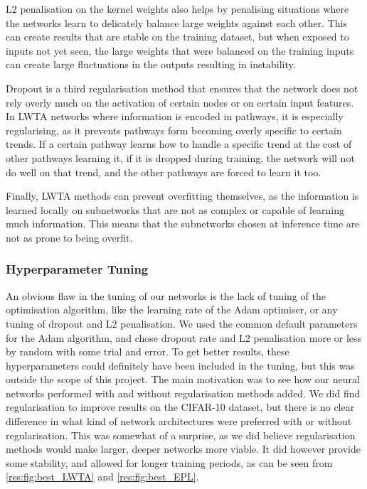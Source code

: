     L2 penalisation on the kernel weights also helps by penalising situations where the networks learn to delicately balance large weights against each other. This can create results that are stable on the training dataset, but when exposed to inputs not yet seen, the large weights that were balanced on the training inputs can create large fluctuations in the outputs resulting in instability.

    Dropout is a third regularisation method that ensures that the network does not rely overly much on the activation of certain nodes or on certain input features. In LWTA networks where information is encoded in pathways, it is especially regularising, as it prevents pathways form becoming overly specific to certain trends. If a certain pathway learns how to handle a specific trend at the cost of other pathways learning it, if it is dropped during training, the network will not do well on that trend, and the other pathways are forced to learn it too.

    Finally, LWTA methods can prevent overfitting themselves, as the information is learned locally on subnetworks that are not as complex or capable of learning much information. This means that the subnetworks chosen at inference time are not as prone to being overfit.



\subsubsection{Hyperparameter Tuning}
    An obvious flaw in the tuning of our networks is the lack of tuning of the optimisation algorithm, like the learning rate of the Adam optimiser, or any tuning of dropout and L2 penalisation. We used the common default parameters for the Adam algorithm, and chose dropout rate and L2 penalisation more or less by random with some trial and error. To get better results, these hyperparameters could definitely have been included in the tuning, but this was outside the scope of this project. The main motivation was to see how our neural networks performed with and without regularisation methods added.
    We did find regularisation to improve results on the CIFAR-10 dataset, but there is no clear difference in what kind of network architectures were preferred with or without regularisation. This was somewhat of a surprise, as we did believe regularisation methods would make larger, deeper networks more viable. It did however provide some stability, and allowed for longer training periods, as can be seen from \cref{res:fig:best_LWTA} and \cref{res:fig:best_EPL}.

